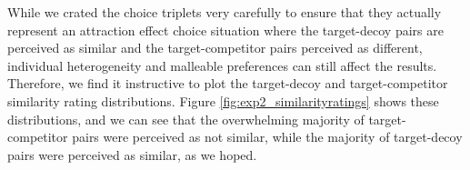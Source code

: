 \documentclass[12pt, a4paper]{article}
\begin{document}
\begin{table}[!htbp] \centering 
\captionsetup{justification=centering}
  \caption{Odds-ratios and 95\% CIs from a mixed-effects logistic model with subject-specific intercepts. (T - Target, C - Competitor, D - Decoy)} 
  \label{latentattr_exp2reg} 
\end{table}

While we crated the choice triplets very carefully to ensure that they actually represent an attraction effect choice situation where the target-decoy pairs are perceived as similar and the target-competitor pairs perceived as different, individual heterogeneity and malleable preferences can still affect the results. Therefore, we find it instructive to plot the target-decoy and target-competitor similarity rating distributions. Figure \ref{fig:exp2_similarityratings} shows these distributions, and we can see that the overwhelming majority of target-competitor pairs were perceived as not similar, while the majority of target-decoy pairs were perceived as similar, as we hoped.
\end{document}

